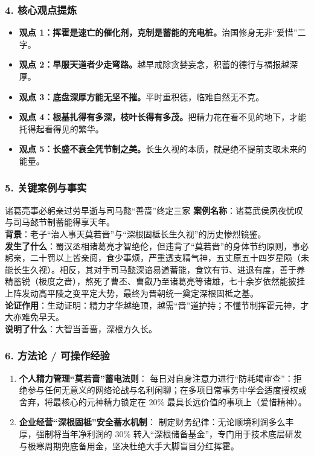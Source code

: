 \subsubsection{4. 核心观点提炼}
\begin{itemize}
    \item \textbf{观点 1：挥霍是速亡的催化剂，克制是蓄能的充电桩。}治国修身无非“爱惜”二字。
    \item \textbf{观点 2：早服天道者少走弯路。}越早戒除贪婪妄念，积蓄的德行与福报越深厚。
    \item \textbf{观点 3：底盘深厚方能无坚不摧。}平时重积德，临难自然无不克。
    \item \textbf{观点 4：根基扎得有多深，枝叶长得有多茂。}把精力花在看不见的地下，才能托得起看得见的繁华。
    \item \textbf{观点 5：长盛不衰全凭节制之美。}长生久视的本质，就是绝不提前支取未来的能量。
\end{itemize}

\subsubsection{5. 关键案例与事实}
\begin{CaseBox}{诸葛亮事必躬亲过劳早逝与司马懿“善啬”终定三家}
\textbf{案例名称}：诸葛武侯夙夜忧叹与司马懿节制蓄能得享天年。\\
\textbf{背景}：老子“治人事天莫若啬”与“深根固柢长生久视”的历史惨烈镜鉴。\\
\textbf{发生了什么}：蜀汉丞相诸葛亮才智绝伦，但违背了“莫若啬”的身体节约原则，事必躬亲，二十罚以上皆亲阅，食少事烦，严重透支精气神，五丈原五十四岁星陨（未能长生久视）。相反，其对手司马懿深谙易道蓄能，食饮有节、进退有度，善于养精蓄锐（极度之啬），熬死了曹丕、曹叡乃至诸葛亮等诸雄，七十余岁依然能披挂上阵发动高平陵之变平定大势，最终为晋朝统一奠定深根固柢之基。\\
\textbf{论证作用}：生动证明：精力才华越绝顶，越需“啬”道护持；不懂节制挥霍元神，才大亦难免早夭。\\
\textbf{说明了什么}：大智当善啬，深根方久长。
\end{CaseBox}

\subsubsection{6. 方法论 / 可操作经验}
\begin{enumerate}
    \item \textbf{个人精力管理“莫若啬”蓄电法则}：
    每日对自身注意力进行“防耗竭审查”：拒绝参与任何无意义的网络论战与名利闲聊；在多项日常事务中学会适度授权或舍弃，将最核心的元神精力锁定在 20\% 最具长远价值的事项上（爱惜精神）。
    \item \textbf{企业经营“深根固柢”安全蓄水机制}：
    制定财务纪律：无论顺境利润多么丰厚，强制将当年净利润的 30\% 转入“深根储备基金”，专门用于技术底层研发与极寒周期兜底备用金，坚决杜绝大手大脚盲目分红挥霍。
\end{enumerate}

